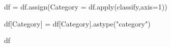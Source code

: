 \documentclass[
  letterpaper,
  DIV=11,
  numbers=noendperiod]{scrartcl}
\newenvironment{Shaded}{\begin{snugshade}}{\end{snugshade}}
\newcommand{\BuiltInTok}[1]{\textcolor[rgb]{0.00,0.23,0.31}{#1}}
\newcommand{\DecValTok}[1]{\textcolor[rgb]{0.68,0.00,0.00}{#1}}
\newcommand{\NormalTok}[1]{\textcolor[rgb]{0.00,0.23,0.31}{#1}}
\newcommand{\OperatorTok}[1]{\textcolor[rgb]{0.37,0.37,0.37}{#1}}
\newcommand{\StringTok}[1]{\textcolor[rgb]{0.13,0.47,0.30}{#1}}
\begin{document}
\begin{Shaded}
\begin{Highlighting}[]

\NormalTok{df }\OperatorTok{=}\NormalTok{ df.assign(Category }\OperatorTok{=}\NormalTok{ df.}\BuiltInTok{apply}\NormalTok{(classify,axis}\OperatorTok{=}\DecValTok{1}\NormalTok{))}
\end{Highlighting}
\end{Shaded}

\begin{Shaded}
\begin{Highlighting}[]

\NormalTok{df[}\StringTok{\textquotesingle{}Category\textquotesingle{}}\NormalTok{] }\OperatorTok{=}\NormalTok{ df[}\StringTok{\textquotesingle{}Category\textquotesingle{}}\NormalTok{].astype(}\StringTok{"category"}\NormalTok{)}
\end{Highlighting}
\end{Shaded}

\begin{Shaded}
\begin{Highlighting}[]

\NormalTok{df}
\end{Highlighting}
\end{Shaded}
\end{document}
